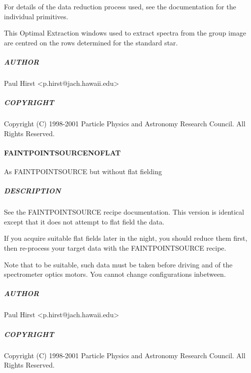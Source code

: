 \documentclass[twoside,11pt]{article}
\renewcommand{\_}{\texttt{\symbol{95}}}
\begin{document}
For details of the data reduction process used, see the documentation
for the individual primitives.



This Optimal Extraction windows used to extract spectra from the group
image are centred on the rows determined for the standard star.

\subparagraph*{AUTHOR\label{FAINT_POINT_SOURCE_AUTHOR}}

Paul Hirst <p.hirst@jach.hawaii.edu>

\subparagraph*{COPYRIGHT\label{FAINT_POINT_SOURCE_COPYRIGHT}}

Copyright (C) 1998-2001 Particle Physics and Astronomy Research
Council. All Rights Reserved.

\paragraph*{FAINT\_POINT\_SOURCE\_NOFLAT\label{FAINT_POINT_SOURCE_NOFLAT}}

As FAINT\_POINT\_SOURCE but without flat fielding

\subparagraph*{DESCRIPTION\label{FAINT_POINT_SOURCE_NOFLAT_DESCRIPTION}}

See the FAINT\_POINT\_SOURCE recipe documentation. This version is
identical except that it does not attempt to flat field the data.



If you acquire suitable flat fields later in the night, you should
reduce them first, then re-process your target data with the
FAINT\_POINT\_SOURCE recipe.



Note that to be suitable, such data must be taken before driving and
of the spectrometer optics motors. You cannot change configurations
inbetween.

\subparagraph*{AUTHOR\label{FAINT_POINT_SOURCE_NOFLAT_AUTHOR}}

Paul Hirst <p.hirst@jach.hawaii.edu>

\subparagraph*{COPYRIGHT\label{FAINT_POINT_SOURCE_NOFLAT_COPYRIGHT}}

Copyright (C) 1998-2001 Particle Physics and Astronomy Research
Council. All Rights Reserved.
\end{document}
